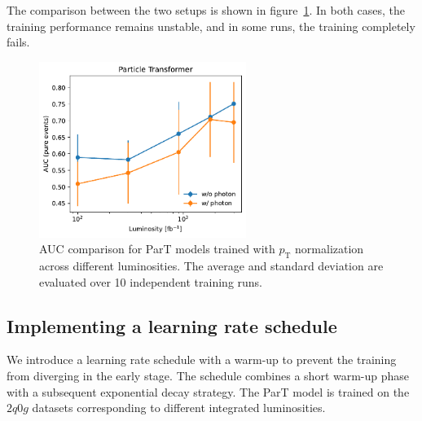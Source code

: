 \documentclass[12pt]{article}
\begin{document}
        The comparison between the two setups is shown in figure~\ref{fig:ParT_AUC_various_L_pTnorm}. In both cases, the training performance remains unstable, and in some runs, the training completely fails.
        \begin{figure}[htpb]
            \centering
            \includegraphics[width=0.60\textwidth]{ParT_AUC-true_L-pTnorm.pdf}
            \caption{AUC comparison for ParT models trained with $p_{\text{T}}$ normalization across different luminosities. The average and standard deviation are evaluated over 10 independent training runs.}
            \label{fig:ParT_AUC_various_L_pTnorm}
        \end{figure}
    \subsection{Implementing a learning rate schedule}%
    \label{sub:implement_learning_rate_schedule}

        We introduce a learning rate schedule with a warm-up to prevent the training from diverging in the early stage. The schedule combines a short warm-up phase with a subsequent exponential decay strategy. The ParT model is trained on the $2q0g$ datasets corresponding to different integrated luminosities.
\end{document}
